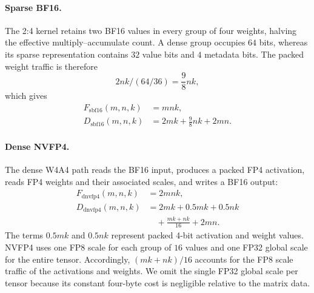 \documentclass[letterpaper]{article} %
\numberwithin{equation}{section}
\numberwithin{table}{section}
\begin{document}
\paragraph{Sparse BF16.}
The 2:4 kernel retains two BF16 values in every group of four weights, halving
the effective multiply--accumulate count. A dense group occupies \(64\) bits,
whereas its sparse representation contains \(32\) value bits and \(4\)
metadata bits. The packed weight traffic is therefore
\begin{equation}
2nk\big/(64/36)=\frac{9}{8}nk,
\end{equation}
which gives
\begin{equation}
\begin{aligned}
F_{\mathrm{sbf16}}(m,n,k) &= mnk,\\
D_{\mathrm{sbf16}}(m,n,k) &= 2mk+\frac{9}{8}nk+2mn.
\end{aligned}
\end{equation}


\paragraph{Dense NVFP4.}
The dense W4A4 path reads the BF16 input, produces a packed FP4 activation,
reads FP4 weights and their associated scales, and writes a BF16 output:
\begin{equation}
\begin{aligned}
F_{\mathrm{dnvfp4}}(m,n,k) &= 2mnk,\\
D_{\mathrm{dnvfp4}}(m,n,k)
&=2mk+0.5mk+0.5nk\\
&\quad+\frac{mk+nk}{16}+2mn.
\end{aligned}
\end{equation}
The terms \(0.5mk\) and \(0.5nk\) represent packed 4-bit activation and
weight values. NVFP4 uses one FP8 scale for each group of \(16\) values and
one FP32 global scale for the entire tensor. Accordingly,
\((mk+nk)/16\) accounts for the FP8 scale traffic of the activations and
weights. We omit the single FP32 global scale per tensor because its constant
four-byte cost is negligible relative to the matrix data.
\end{document}
